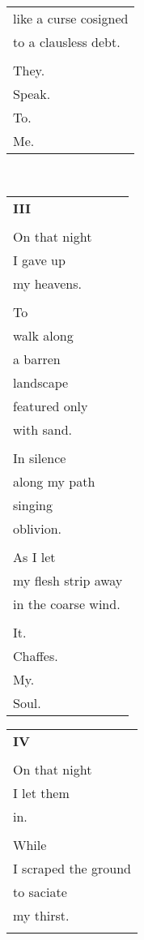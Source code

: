\documentclass{article}
\begin{document}
\begin{center}
\begin{tabular}{l}
like a curse cosigned \\
to a clausless debt. \\
\\
They. \\
\hh{}Speak. \\
\hh{}\hh{}To. \\
\hh{}\hh{}\hh{}Me. \\
\end{tabular} \\
\begin{tabular}{l}
\textbf{III} \\
\\
On that night \\
\hh{}I gave up\\
\hh{}my heavens. \\
\\
To \\
walk along \\
a barren \\
landscape \\
featured only \\
with sand. \\
\\
In silence \\
along my path \\
singing \\
oblivion. \\
\\
As I let \\
my flesh strip away\\
in the coarse wind. \\
\\
It. \\
\hh{}Chaffes. \\
\hh{}\hh{}My. \\
\hh{}\hh{}\hh{}Soul. \\
\end{tabular}
\begin{tabular}{l}
\textbf{IV} \\
\\
On that night \\
\hh{}I let them\\
\hh{}in. \\
\\
While \\
I scraped the ground \\
to saciate \\
my thirst. \\
\\

\end{tabular}
\end{center}
\end{document}
